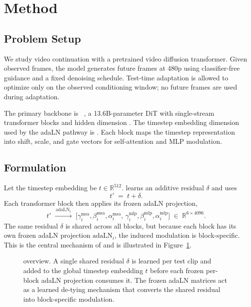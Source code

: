 \section{Method}
\label{sec:method}

\subsection{Problem Setup}
\label{sec:method_setup}

We study video continuation with a pretrained video diffusion transformer.
Given observed frames, the model generates future frames at 480p using
classifier-free guidance and a fixed denoising schedule. Test-time adaptation
is allowed to optimize only on the observed conditioning window; no future
frames are used during adaptation.

The primary backbone is \backbone~\citep{meituan2025longcatvideo}, a
13.6B-parameter DiT with \nblocks single-stream transformer blocks and hidden
dimension \dimh. The timestep embedding dimension used by the adaLN pathway is
\dimt. Each block maps the timestep representation into shift, scale, and gate
vectors for self-attention and MLP modulation.

\subsection{\method Formulation}
\label{sec:method_formulation}

Let the timestep embedding be $t \in \mathbb{R}^{512}$. \method learns an
additive residual $\delta$ and uses
\begin{equation}
  t' \;=\; t + \delta.
  \label{eq:adasteer-residual}
\end{equation}
Each transformer block then applies its frozen adaLN projection,
\begin{equation}
  t' \;\xrightarrow{\,\mathrm{adaLN}_i\,}\;
  \bigl[
    \gamma_i^{\mathrm{msa}}, \beta_i^{\mathrm{msa}}, \alpha_i^{\mathrm{msa}},\,
    \gamma_i^{\mathrm{mlp}}, \beta_i^{\mathrm{mlp}}, \alpha_i^{\mathrm{mlp}}
  \bigr]
  \;\in\; \mathbb{R}^{6 \times 4096}.
  \label{eq:adaln}
\end{equation}
The same residual $\delta$ is shared across all blocks, but because each block
has its own frozen adaLN projection $\mathrm{adaLN}_i$, the induced modulation
is block-specific. This is the central mechanism of \method and is illustrated
in Figure~\ref{fig:method}.

\begin{figure}[t]
  \centering
  \rule{0pt}{4cm}\framebox[0.9\linewidth]{\rule{0pt}{4cm}}%
  \caption{\method overview. A single shared residual $\delta$ is learned per
  test clip and added to the global timestep embedding $t$ before each frozen
  per-block adaLN projection consumes it. The frozen adaLN matrices act as a
  learned de-tying mechanism that converts the shared residual into
  block-specific modulation.}
  \label{fig:method}
\end{figure}


